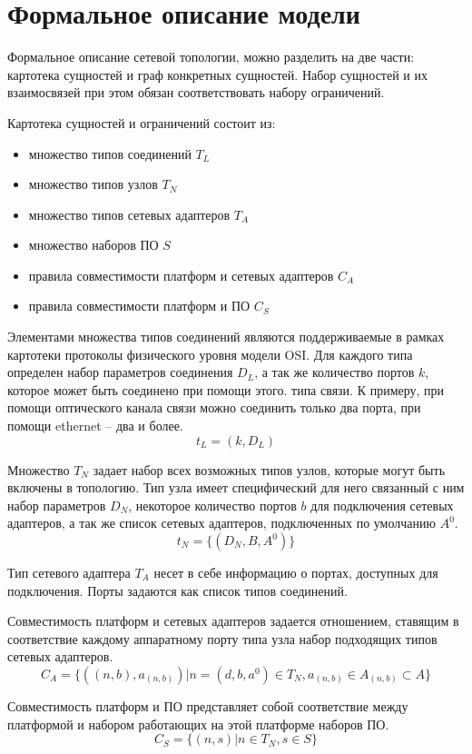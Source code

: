 \section{Формальное описание модели}

Формальное описание сетевой топологии, можно разделить на две части:
картотека сущностей и граф конкретных сущностей. 
Набор сущностей и их взаимосвязей при этом обязан соответствовать набору ограничений.

Картотека сущностей и ограничений состоит из:
\begin{itemize}
    \item множество типов соединений $T_L$
    \item множество типов узлов $T_N$
    \item множество типов сетевых адаптеров $T_A$
    \item множество наборов ПО $S$
    \item правила совместимости платформ и сетевых адаптеров $C_A$
    \item правила совместимости платформ и ПО $C_S$
\end{itemize}

Элементами множества типов соединений являются поддерживаемые в рамках картотеки
протоколы физического уровня модели OSI. Для каждого типа определен набор параметров
соединения $D_L$, а так же количество портов $k$, которое может быть соединено при помощи этого.
типа связи. К примеру, при помощи оптического канала связи можно соединить только два порта,
при помощи ethernet -- два и более. 
$$ t_L = (k, D_L) $$ 

Множество $T_N$ задает набор всех возможных типов узлов, которые могут быть включены в 
топологию. Тип узла имеет специфический для него связанный с ним набор параметров $D_N$,
некоторое количество портов $b$ для подключения сетевых адаптеров, 
а так же список сетевых адаптеров, подключенных по умолчанию $A^0$.
$$ t_N = \{ (D_N, B, A^0) \} $$

Тип сетевого адаптера $T_A$ несет в себе информацию о портах, доступных для подключения. 
Порты задаются как список типов соединений.

Совместимость платформ и сетевых адаптеров задается отношением, ставящим в соответствие 
каждому аппаратному порту типа узла набор подходящих типов сетевых адаптеров.
$$ C_A = \{ ((n, b), a_{(n, b)}) | n = (d, b, a^0) \in T_N, a_{(n, b)} \in A_{(n, b)} \subset A \} $$

Совместимость платформ и ПО представляет собой соответствие между платформой и набором
работающих на этой платформе наборов ПО.
$$ C_S = \{ (n, s) | n \in T_N, s \in S \} $$

